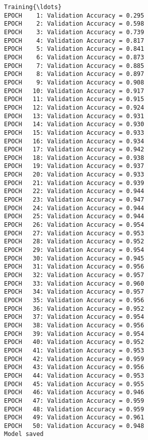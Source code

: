 \documentclass[11pt]{article}
\begin{document}
    \begin{Verbatim}[commandchars=\\\{\}]
Training{\ldots}
EPOCH    1: Validation Accuracy = 0.295
EPOCH    2: Validation Accuracy = 0.598
EPOCH    3: Validation Accuracy = 0.739
EPOCH    4: Validation Accuracy = 0.817
EPOCH    5: Validation Accuracy = 0.841
EPOCH    6: Validation Accuracy = 0.873
EPOCH    7: Validation Accuracy = 0.885
EPOCH    8: Validation Accuracy = 0.897
EPOCH    9: Validation Accuracy = 0.908
EPOCH   10: Validation Accuracy = 0.917
EPOCH   11: Validation Accuracy = 0.915
EPOCH   12: Validation Accuracy = 0.924
EPOCH   13: Validation Accuracy = 0.931
EPOCH   14: Validation Accuracy = 0.930
EPOCH   15: Validation Accuracy = 0.933
EPOCH   16: Validation Accuracy = 0.934
EPOCH   17: Validation Accuracy = 0.942
EPOCH   18: Validation Accuracy = 0.938
EPOCH   19: Validation Accuracy = 0.937
EPOCH   20: Validation Accuracy = 0.933
EPOCH   21: Validation Accuracy = 0.939
EPOCH   22: Validation Accuracy = 0.944
EPOCH   23: Validation Accuracy = 0.947
EPOCH   24: Validation Accuracy = 0.944
EPOCH   25: Validation Accuracy = 0.944
EPOCH   26: Validation Accuracy = 0.954
EPOCH   27: Validation Accuracy = 0.953
EPOCH   28: Validation Accuracy = 0.952
EPOCH   29: Validation Accuracy = 0.954
EPOCH   30: Validation Accuracy = 0.945
EPOCH   31: Validation Accuracy = 0.956
EPOCH   32: Validation Accuracy = 0.957
EPOCH   33: Validation Accuracy = 0.960
EPOCH   34: Validation Accuracy = 0.957
EPOCH   35: Validation Accuracy = 0.956
EPOCH   36: Validation Accuracy = 0.952
EPOCH   37: Validation Accuracy = 0.954
EPOCH   38: Validation Accuracy = 0.956
EPOCH   39: Validation Accuracy = 0.954
EPOCH   40: Validation Accuracy = 0.952
EPOCH   41: Validation Accuracy = 0.953
EPOCH   42: Validation Accuracy = 0.959
EPOCH   43: Validation Accuracy = 0.956
EPOCH   44: Validation Accuracy = 0.953
EPOCH   45: Validation Accuracy = 0.955
EPOCH   46: Validation Accuracy = 0.946
EPOCH   47: Validation Accuracy = 0.959
EPOCH   48: Validation Accuracy = 0.959
EPOCH   49: Validation Accuracy = 0.961
EPOCH   50: Validation Accuracy = 0.948
Model saved

    \end{Verbatim}

    \begin{center}
    \end{center}
    { \hspace*{\fill} \\}
    
\end{document}

